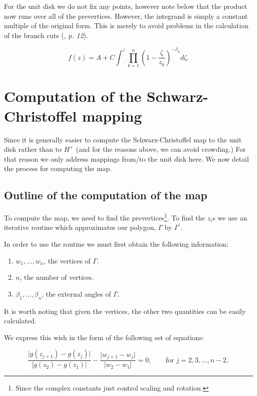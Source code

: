 \documentclass[a4paper,10pt]{amsart}
\newcommand{\sch}{Schwarz-Christoffel }
\begin{document}
For the unit disk we do not fix any points, however note below that the product now runs over all of the prevertices. However, the integrand is simply a constant multiple of the original form. This is merely to avoid problems in the calculation of the branch cuts (\cite{driscoll}, \emph{p. 12}).

\begin{equation}
\label{unitscmap}
f(z) = A + C \int^z \prod_{k=1}^{n} (1 - \frac{\zeta}{z_k})^{-\beta_k} d\zeta.
\end{equation}


\section{Computation of the \sch mapping}

Since it is generally easier to compute the \sch map to the unit disk rather than to $H^+$ (and for the reasons above, we can avoid crowding.) For that reason we only address mappings from/to the unit disk here. We now detail the process for computing the map.


\subsection{Outline of the computation of the map}
To compute the map, we need to find the prevertices\footnote{Since the complex constants just control scaling and rotation.}. To find the $z_i$s we use an iterative routine which approximates our polygon, $\Gamma$ by $\Gamma^\prime$. 

In order to use the routine we must first obtain the following information:

\begin{enumerate}
\item $w_1, \dots, w_n$, the vertices of $\Gamma$.
\item $n$, the number of vertices.
\item $\beta_1, \dots, \beta_n$, the external angles of $\Gamma$.
\end{enumerate}

It is worth noting that given the vertices, the other two quantities can be easily calculated.

We express this wish in the form of the following set of equations:

\begin{equation}
\label{optimizeme}
\frac{\vert g(z_{j+1}) -  g(z_j) \vert}{\vert g(z_2)-g(z_1)\vert} - \frac{\vert w_{j+1} - w_j\vert}{\vert w_2 - w_1\vert} = 0, \qquad \text{for } j=2,3,\dots,n-2,
\end{equation}
\end{document}
